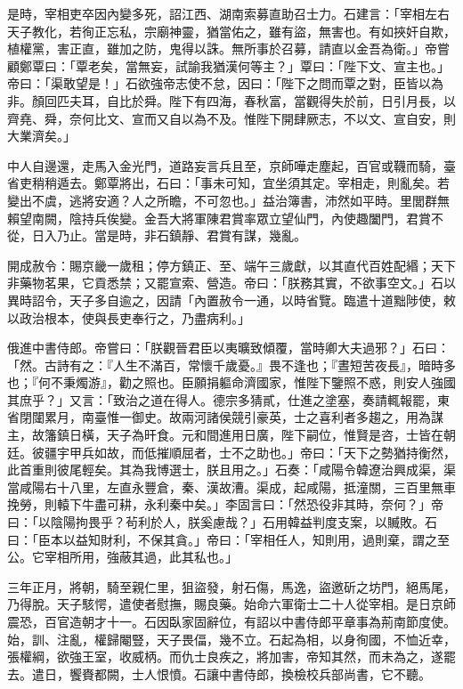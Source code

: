 \begin{pinyinscope}
 是時，宰相吏卒因內變多死，詔江西、湖南索募直助召士力。石建言：「宰相左右天子教化，若徇正忘私，宗廟神靈，猶當佑之，雖有盜，無害也。有如挾奸自欺，植權黨，害正直，雖加之防，鬼得以誅。無所事於召募，請直以金吾為衛。」帝嘗顧鄭覃曰：「覃老矣，當無妄，試諭我猶漢何等主？」覃曰：「陛下文、宣主也。」帝曰：「渠敢望是！」石欲強帝志使不怠，因曰：「陛下之問而覃之對，臣皆以為非。顏回匹夫耳，自比於舜。陛下有四海，春秋富，當觀得失於前，日引月長，以齊堯、舜，奈何比文、宣而又自以為不及。惟陛下開肆厥志，不以文、宣自安，則大業濟矣。」



 中人自邊還，走馬入金光門，道路妄言兵且至，京師嘩走塵起，百官或韈而騎，臺省吏稍稍遁去。鄭覃將出，石曰：「事未可知，宜坐須其定。宰相走，則亂矣。若變出不虞，逃將安適？人之所瞻，不可忽也。」益治簿書，沛然如平時。里閭群無賴望南闕，陰持兵俟變。金吾大將軍陳君賞率眾立望仙門，內使趣闔門，君賞不從，日入乃止。當是時，非石鎮靜、君賞有謀，幾亂。



 開成赦令：賜京畿一歲租；停方鎮正、至、端午三歲獻，以其直代百姓配緡；天下非藥物茗果，它貢悉禁；又罷宣索、營造。帝曰：「朕務其實，不欲事空文。」石以異時詔令，天子多自逾之，因請「內置赦令一通，以時省覽。臨遣十道黜陟使，敕以政治根本，使與長吏奉行之，乃盡病利。」



 俄進中書侍郎。帝嘗曰：「朕觀晉君臣以夷曠致傾覆，當時卿大夫過邪？」石曰：「然。古詩有之：『人生不滿百，常懷千歲憂。』畏不逢也；『晝短苦夜長』，暗時多也；『何不秉燭游』，勸之照也。臣願捐軀命濟國家，惟陛下鑒照不惑，則安人強國其庶乎？」又言：「致治之道在得人。德宗多猜貳，仕進之塗塞，奏請輒報罷，東省閉闥累月，南臺惟一御史。故兩河諸侯競引豪英，士之喜利者多趨之，用為謀主，故籓鎮日橫，天子為旰食。元和間進用日廣，陛下嗣位，惟賢是咨，士皆在朝廷。彼疆宇甲兵如故，而低摧順屈者，士不之助也。」帝曰：「天下之勢猶持衡然，此首重則彼尾輕矣。其為我博選士，朕且用之。」石奏：「咸陽令韓遼治興成渠，渠當咸陽右十八里，左直永豐倉，秦、漢故漕。渠成，起咸陽，抵潼關，三百里無車挽勞，則轅下牛盡可耕，永利秦中矣。」李固言曰：「然恐役非其時，奈何？」帝曰：「以陰陽拘畏乎？茍利於人，朕奚慮哉？」石用韓益判度支案，以贓敗。石曰：「臣本以益知財利，不保其貪。」帝曰：「宰相任人，知則用，過則棄，謂之至公。它宰相所用，強蔽其過，此其私也。」



 三年正月，將朝，騎至親仁里，狙盜發，射石傷，馬逸，盜邀斫之坊門，絕馬尾，乃得脫。天子駭愕，遣使者慰撫，賜良藥。始命六軍衛士二十人從宰相。是日京師震恐，百官造朝才十一。石因臥家固辭位，有詔以中書侍郎平章事為荊南節度使。始，訓、注亂，權歸閹豎，天子畏偪，幾不立。石起為相，以身徇國，不恤近幸，張權綱，欲強王室，收威柄。而仇士良疾之，將加害，帝知其然，而未為之，遂罷去。遣日，饗賚都闕，士人恨憤。石讓中書侍郎，換檢校兵部尚書，它不聽。




\end{pinyinscope}
